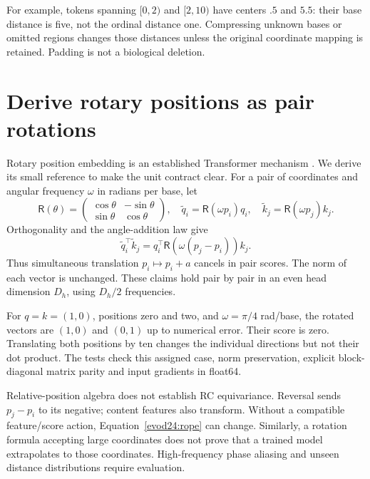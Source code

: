 For example, tokens spanning $[0,2)$ and $[2,10)$ have centers $.5$ and $5.5$:
their base distance is five, not the ordinal distance one. Compressing unknown
bases or omitted regions changes those distances unless the original coordinate
mapping is retained. Padding is not a biological deletion.

\section{Derive rotary positions as pair rotations}
Rotary position embedding is an established Transformer mechanism
\cite{evod24:rope}. We derive its small reference to make the unit contract clear.
For a pair of coordinates and angular frequency $\omega$ in radians per base,
let
\[
\mathsf R(\theta)=
\begin{pmatrix}\cos\theta&-\sin\theta\\\sin\theta&\cos\theta\end{pmatrix},
\quad
\tilde q_i=\mathsf R(\omega p_i)q_i,\quad
\tilde k_j=\mathsf R(\omega p_j)k_j.
\]
Orthogonality and the angle-addition law give
\begin{equation}
\tilde q_i^\top\tilde k_j
=q_i^\top\mathsf R\!\left(\omega(p_j-p_i)\right)k_j.
\label{evod24:rope}
\end{equation}
Thus simultaneous translation $p_i\mapsto p_i+a$ cancels in pair scores.
The norm of each vector is unchanged. These claims hold pair by pair in an even
head dimension $D_h$, using $D_h/2$ frequencies.


For $q=k=(1,0)$, positions zero and two, and $\omega=\pi/4$ rad/base, the rotated
vectors are $(1,0)$ and $(0,1)$ up to numerical error. Their score is zero.
Translating both positions by ten changes the individual directions but not their
dot product. The tests check this assigned case, norm preservation, explicit
block-diagonal matrix parity and input gradients in float64.

Relative-position algebra does not establish RC equivariance. Reversal sends
$p_j-p_i$ to its negative; content features also transform. Without a compatible
feature/score action, Equation~\ref{evod24:rope} can change. Similarly, a rotation
formula accepting large coordinates does not prove that a trained model
extrapolates to those coordinates. High-frequency phase aliasing and unseen
distance distributions require evaluation.

